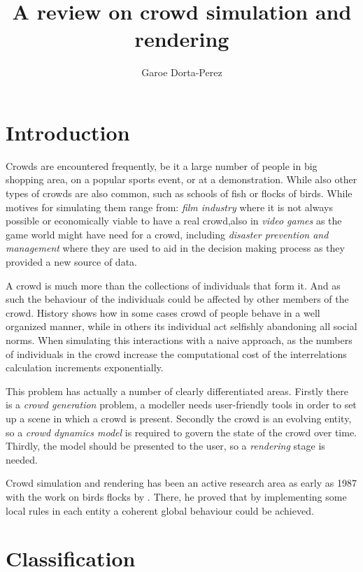\documentclass[conference]{acmsiggraph}
\title{A review on crowd simulation and rendering}
\author{Garoe Dorta-Perez}
\begin{document}
\maketitle


\section{Introduction}

Crowds are encountered frequently, be it a large number of people in big shopping area, on a popular sports event, or at a demonstration.
While also other types of crowds are also common, such as schools of fish or flocks of birds.
While motives for simulating them range from: \textit{film industry} where it is not always possible or economically viable to have a real crowd,also in \textit{video games} as the game world might have need for a crowd, including \textit{disaster prevention and management} where they are used to aid in the decision making process as they provided a new source of data. 

A crowd is much more than the collections of individuals that form it.
And as such the behaviour of the individuals could be affected by other members of the crowd.
History shows how in some cases crowd of people behave in a well organized manner, while in others its individual act selfishly abandoning all social norms.
When simulating this interactions with a naive approach, as the numbers of individuals in the crowd increase the computational cost of the interrelations calculation increments exponentially.

This problem has actually a number of clearly differentiated areas.
Firstly there is a \textit{crowd generation} problem, a modeller needs user-friendly tools in order to set up a scene in which a crowd is present.
Secondly the crowd is an evolving entity, so a \textit{crowd dynamics model} is required to govern the state of the crowd over time.
Thirdly, the model should be presented to the user, so a \textit{rendering} stage is needed.

Crowd simulation and rendering has been an active research area as early as 1987 with the work on birds flocks by \cite{Reynolds1987}.
There, he proved that by implementing some local rules in each entity a coherent global behaviour could be achieved.

\section{Classification}
\end{document}
